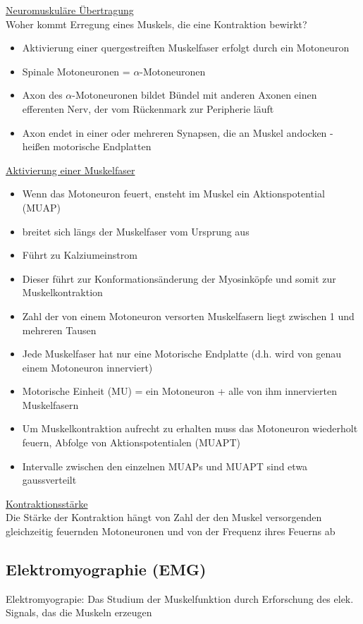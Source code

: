 \documentclass[a4paper,10pt,oneside]{article}
\begin{document}
\underline{Neuromuskuläre Übertragung} \\
Woher kommt Erregung eines Muskels, die eine Kontraktion bewirkt?
	\begin{itemize}
		\item Aktivierung einer quergestreiften Muskelfaser erfolgt durch ein Motoneuron
		\item Spinale Motoneuronen = $\alpha$-Motoneuronen
		\item Axon des $\alpha$-Motoneuronen bildet Bündel mit anderen Axonen einen efferenten Nerv, der vom Rückenmark zur Peripherie läuft
		\item Axon endet in einer oder mehreren Synapsen, die an Muskel andocken - heißen motorische Endplatten
	\end{itemize}
	
\underline{Aktivierung einer Muskelfaser} \\
	\begin{itemize}
		\item Wenn das Motoneuron feuert, ensteht im Muskel ein Aktionspotential (MUAP)
		\item breitet sich längs der Muskelfaser vom Ursprung aus
		\item Führt zu Kalziumeinstrom
		\item Dieser führt zur Konformationsänderung der Myosinköpfe und somit zur Muskelkontraktion
		\item Zahl der von einem Motoneuron versorten Muskelfasern liegt zwischen 1 und mehreren Tausen
		\item Jede Muskelfaser hat nur eine Motorische Endplatte (d.h. wird von genau einem Motoneuron innerviert)
		\item Motorische Einheit (MU) = ein Motoneuron + alle von ihm innervierten Muskelfasern
		\item Um Muskelkontraktion aufrecht zu erhalten muss das Motoneuron wiederholt feuern, Abfolge von Aktionspotentialen (MUAPT)
		\item Intervalle zwischen den einzelnen MUAPs und MUAPT sind etwa gaussverteilt
	\end{itemize}
	
\underline{Kontraktionsstärke} \\
Die Stärke der Kontraktion hängt von Zahl der den Muskel versorgenden gleichzeitig feuernden Motoneuronen und von der Frequenz ihres Feuerns ab

\subsection{Elektromyographie (EMG)}
Elektromyograpie: Das Studium der Muskelfunktion durch Erforschung des elek. Signals, das die Muskeln erzeugen
\end{document}

